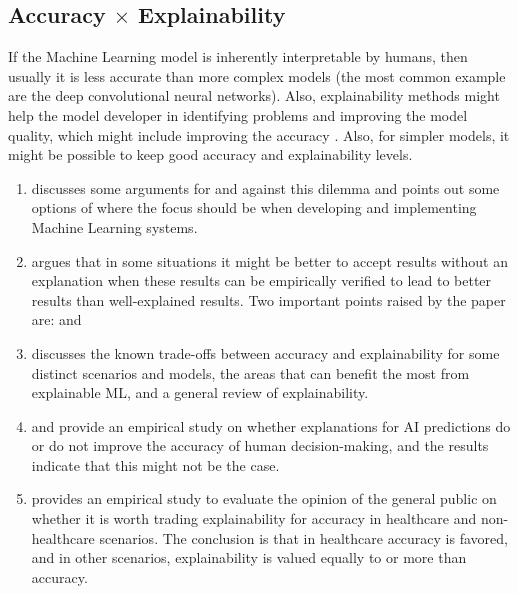 \subsection{Accuracy $\times$ Explainability}

If the Machine Learning model is inherently interpretable by humans, then usually it is less accurate than more complex models (the most common example are the deep convolutional neural networks). Also, explainability methods might help the model developer in identifying problems and improving the model quality, which might include improving the accuracy \cite{burkart2021survey}. Also, for simpler models, it might be possible to keep good accuracy and explainability levels.

\begin{enumerate}
\item \cite{petkovic2023not} discusses some arguments for and against this dilemma and points out some options of where the focus should be when developing and implementing Machine Learning systems.
\item \cite{london2019artificial} argues that in some situations it might be better to accept results without an explanation when these results can be empirically verified to lead to better results than well-explained results. Two important points raised by the paper are:  and 
\item \cite{angelov2021explainable} discusses the known trade-offs between accuracy and explainability for some distinct scenarios and models, the areas that can benefit the most from explainable ML, and a general review of explainability.
\item \cite{bell2022s} and \cite{alufaisan2021does} provide an empirical study on whether explanations for AI predictions do or do not improve the accuracy of human decision-making, and the results indicate that this might not be the case.
\item \cite{van2021trading} provides an empirical study to evaluate the opinion of the general public on whether it is worth trading explainability for accuracy in healthcare and non-healthcare scenarios. The conclusion is that in healthcare accuracy is favored, and in other scenarios, explainability is valued equally to or more than accuracy.
\end{enumerate}

